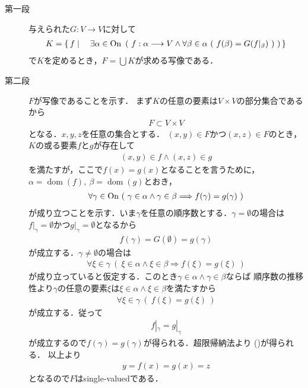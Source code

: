 	\begin{prf}\mbox{}
		\begin{description}
			\item[第一段] 与えられた$G:V \longrightarrow V$に対して
				\begin{align}
					K = \left\{\, f \mid \quad \exists \alpha \in \mathrm{On}\ \left(\ f:\alpha \longrightarrow V \wedge \forall \beta \in \alpha\ (\ f(\beta) = G(f|_\beta)\ )\ \right)\, \right\}
				\end{align}
				で$K$を定めるとき，$F = \bigcup K$が求める写像である．
				
			\item[第二段] $F$が写像であることを示す．
				まず$K$の任意の要素は$V \times V$の部分集合であるから
				\begin{align}
					F \subset V \times V
				\end{align}
				となる．$x,y,z$を任意の集合とする．
				$(x,y) \in F$かつ$(x,z) \in F$のとき，
				$K$の或る要素$f$と$g$が存在して
				\begin{align}
					(x,y) \in f \wedge (x,z) \in g
				\end{align}
				を満たすが，ここで$f(x) = g(x)$となることを言うために，
				$\alpha = \operatorname{dom}(f),\ 
				\beta = \operatorname{dom}(g)$とおき，
				\begin{align}
					\forall \gamma \in \mathrm{On}\ (\ \gamma \in \alpha \wedge \gamma \in \beta \Longrightarrow f(\gamma) = g(\gamma)\ )
					\label{eq:thm_transfinite_recursion_theorem_1}
				\end{align}
				が成り立つことを示す．いま$\gamma$を任意の順序数とする．$\gamma = \emptyset$の場合は
				$f|_\gamma = \emptyset$かつ$g|_\gamma = \emptyset$となるから
				\begin{align}
					f(\gamma) = G(\emptyset) = g(\gamma)
				\end{align}
				が成立する．$\gamma \neq \emptyset$の場合は
				\begin{align}
					\forall \xi \in \gamma\ (\ \xi \in \alpha \wedge \xi \in \beta \Longrightarrow f(\xi) = g(\xi)\ )
				\end{align}
				が成り立っていると仮定する．このとき$\gamma \in \alpha \wedge \gamma \in \beta$ならば
				順序数の推移性より$\gamma$の任意の要素$\xi$は$\xi \in \alpha \wedge \xi \in \beta$を満たすから
				\begin{align}
					\forall \xi \in \gamma\ (\ f(\xi) = g(\xi)\ )
				\end{align}
				が成立する．従って
				\begin{align}
					f|_\gamma = g|_\gamma
				\end{align}
				が成立するので$f(\gamma) = g(\gamma)$が得られる．超限帰納法より
				()が得られる．
				以上より
				\begin{align}
					y = f(x) = g(x) = z
				\end{align}
				となるので$F$はsingle-valuedである．
			

\end{description}
\end{prf}
